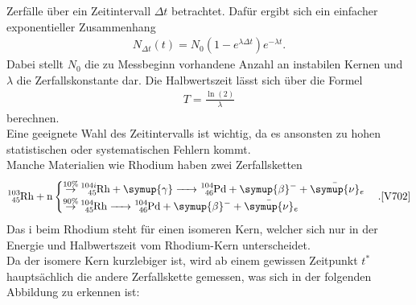 Zerfälle über ein Zeitintervall $\Delta t$ betrachtet. Dafür ergibt sich ein
einfacher exponentieller Zusammenhang \cite{V702}
\begin{align}
    N_{\Delta t} (t) = N_0 (1-e^{\lambda \Delta t}) e^{- \lambda t}. \label{eq:5} 
\end{align}
Dabei stellt $N_0$ die zu Messbeginn vorhandene Anzahl an instabilen Kernen und $\lambda$ die Zerfallskonstante dar.
Die Halbwertszeit lässt sich über die Formel \cite{V702}
\begin{align}
    T=\frac{\ln(2)}{\lambda} \label{eq:6}
\end{align}
berechnen.\\
Eine geeignete Wahl des Zeitintervalls ist wichtig, da es ansonsten zu hohen
statistischen oder systematischen Fehlern kommt.\\
Manche Materialien wie Rhodium haben zwei Zerfallsketten\\
\begin{align}
\ce{^{103}_{45}Rh + n}  
\begin{cases}
    \ce{\stackrel{10\%}{\to} ^{104i}_{45}Rh +\symup{\gamma} -> ^{104}_{46}Pd +\symup{\beta}^- + \bar{\symup{\nu}}_e }\\
    \ce{\stackrel{90\%}{\to} ^{104}_{45}Rh ->  ^{104}_{46}Pd +\symup{\beta}^- + \bar{\symup{\nu}}_e }
\end{cases}.\text{\cite{V702}} \label{eq:7}
\end{align}
Das i beim Rhodium steht für einen isomeren Kern, welcher sich nur in der Energie und
Halbwertszeit vom Rhodium-Kern unterscheidet.\\
Da der isomere Kern kurzlebiger ist, wird ab einem gewissen Zeitpunkt $t^*$ hauptsächlich
die andere Zerfallskette gemessen, was sich in der folgenden Abbildung zu erkennen ist:

